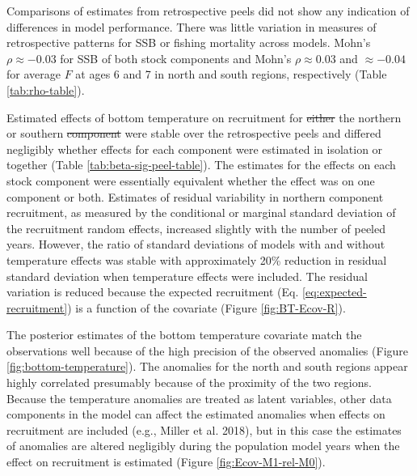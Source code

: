 \documentclass[
]{article}
\makeatletter
\providecommand{\DIFaddtex}[1]{{\protect\color{blue}\uwave{#1}}} %
\providecommand{\DIFdeltex}[1]{{\protect\color{red}\sout{#1}}} %
\providecommand{\DIFaddbegin}{} %
\providecommand{\DIFaddend}{} %
\providecommand{\DIFdelbegin}{} %
\providecommand{\DIFdelend}{} %
\providecommand{\DIFadd}[1]{\texorpdfstring{\DIFaddtex{#1}}{#1}} %
\providecommand{\DIFdel}[1]{\texorpdfstring{\DIFdeltex{#1}}{}} %
\newcommand{\DIFscaledelfig}{0.5}
\newlength{\DIFdelgraphicswidth} %
\newlength{\DIFdelgraphicsheight} %
\newcommand{\DIFaddincludegraphics}[2][]{{\color{blue}\fbox{\DIFOincludegraphics[#1]{#2}}}} %
\newcommand{\DIFdelincludegraphics}[2][]{%
\sbox{\DIFdelgraphicsbox}{\DIFOincludegraphics[#1]{#2}}%
\settoboxwidth{\DIFdelgraphicswidth}{\DIFdelgraphicsbox} %
\settoboxtotalheight{\DIFdelgraphicsheight}{\DIFdelgraphicsbox} %
\scalebox{\DIFscaledelfig}{%
\parbox[b]{\DIFdelgraphicswidth}{\usebox{\DIFdelgraphicsbox}\\[-\baselineskip] \rule{\DIFdelgraphicswidth}{0em}}\llap{\resizebox{\DIFdelgraphicswidth}{\DIFdelgraphicsheight}{%
\setlength{\unitlength}{\DIFdelgraphicswidth}%
\begin{picture}(1,1)%
\thicklines\linethickness{2pt} %
{\color[rgb]{1,0,0}\put(0,0){\framebox(1,1){}}}%
{\color[rgb]{1,0,0}\put(0,0){\line( 1,1){1}}}%
{\color[rgb]{1,0,0}\put(0,1){\line(1,-1){1}}}%
\end{picture}%
}\hspace*{3pt}}} %
} %
\DeclareRobustCommand{\DIFaddbegin}{\DIFOaddbegin \let\includegraphics\DIFaddincludegraphics} %
\DeclareRobustCommand{\DIFaddend}{\DIFOaddend \let\includegraphics\DIFOincludegraphics} %
\DeclareRobustCommand{\DIFdelbegin}{\DIFOdelbegin \let\includegraphics\DIFdelincludegraphics} %
\DeclareRobustCommand{\DIFdelend}{\DIFOaddend \let\includegraphics\DIFOincludegraphics} %
\let\sout@orig\sout %
\renewcommand{\sout}[1]{\ifmmode\text{\sout@orig{\ensuremath{#1}}}\else\sout@orig{#1}\fi} %
\makeatother
\begin{document}
Comparisons of estimates from retrospective peels did not show any indication of differences in model performance. There was little variation in measures of retrospective patterns for SSB or fishing mortality across models. Mohn's \(\rho \approx -0.03\) for SSB of both stock components and Mohn's \(\rho \approx 0.03\) and \(\approx -0.04\) for average \(F\) at ages 6 and 7 in north and south regions, respectively (Table \ref{tab:rho-table}).

Estimated \DIFaddbegin \DIFadd{positive }\DIFaddend effects of bottom temperature on recruitment for \DIFdelbegin \DIFdel{either }\DIFdelend the northern or southern \DIFdelbegin \DIFdel{component }\DIFdelend \DIFaddbegin \DIFadd{components }\DIFaddend were stable over the retrospective peels and differed negligibly whether effects for each component were estimated in isolation or together (Table \ref{tab:beta-sig-peel-table}). The estimates for the effects on each stock component were essentially equivalent whether the effect was on one component or both. Estimates of residual variability in northern component recruitment, as measured by the conditional or marginal standard deviation of the recruitment random effects, increased slightly with the number of peeled years. However, the ratio of standard deviations of models with and without temperature effects was stable with approximately 20\% reduction in residual standard deviation when temperature effects were included. The residual variation is reduced because the expected recruitment (Eq. \ref{eq:expected-recruitment}) is a function of the covariate (Figure \ref{fig:BT-Ecov-R}).

The posterior estimates of the bottom temperature covariate match the observations well because of the high precision of the observed anomalies (Figure \ref{fig:bottom-temperature}). The anomalies for the north and south regions appear highly correlated presumably because of the proximity of the two regions. Because the temperature anomalies are treated as latent variables, other data components in the model can affect the estimated anomalies when effects on recruitment are included (e.g., Miller et al. 2018), but in this case the estimates of anomalies are altered negligibly during the population model years when the effect on recruitment is estimated (Figure \ref{fig:Ecov-M1-rel-M0}).
\end{document}
